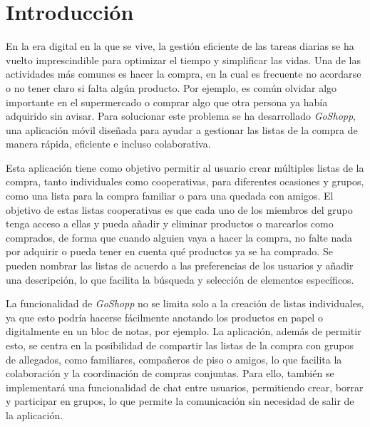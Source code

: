 \documentclass{article}
\begin{document}



\tableofcontents

\newpage

\listoffigures

\newpage

\section{Introducción}

En la era digital en la que se vive, la gestión eficiente de las tareas diarias se ha vuelto imprescindible para optimizar el tiempo y simplificar las vidas. Una de las actividades más comunes es hacer la compra, en la cual es frecuente no acordarse o no tener claro si falta algún producto. Por ejemplo, es común olvidar algo importante en el supermercado o comprar algo que otra persona ya había adquirido sin avisar. Para solucionar este problema se ha desarrollado \textit{GoShopp}, una aplicación móvil diseñada para ayudar a gestionar las listas de la compra de manera rápida, eficiente e incluso colaborativa.

Esta aplicación tiene como objetivo permitir al usuario crear múltiples listas de la compra, tanto individuales como cooperativas, para diferentes ocasiones y grupos, como una lista para la compra familiar o para una quedada con amigos. El objetivo de estas listas cooperativas es que cada uno de los miembros del grupo tenga acceso a ellas y pueda añadir y eliminar productos o marcarlos como comprados, de forma que cuando alguien vaya a hacer la compra, no falte nada por adquirir o pueda tener en cuenta qué productos ya se ha comprado. Se pueden nombrar las listas de acuerdo a las preferencias de los usuarios y añadir una descripción, lo que facilita la búsqueda y selección de elementos específicos.

La funcionalidad de \textit{GoShopp} no se limita solo a la creación de listas individuales, ya que esto podría hacerse fácilmente anotando los productos en papel o digitalmente en un bloc de notas, por ejemplo. La aplicación, además de permitir esto, se centra en la posibilidad de compartir las listas de la compra con grupos de allegados, como familiares, compañeros de piso o amigos, lo que facilita la colaboración y la coordinación de compras conjuntas. Para ello, también se implementará una funcionalidad de chat entre usuarios, permitiendo crear, borrar y participar en grupos, lo que permite la comunicación sin necesidad de salir de la aplicación.
\end{document}
